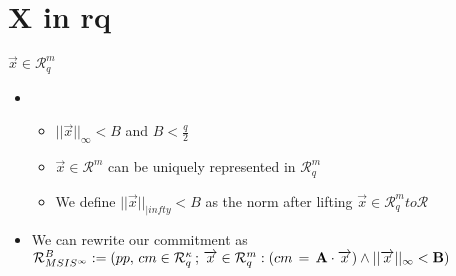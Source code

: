 \section{X in rq}
\begin{frame}{$\overrightarrow{x} \in \mathcal{R}^\mathit{m}_\mathit{q}$}
    \begin{itemize}
        \item  \begin{itemize}
                  \item $||\overrightarrow{x}||_{\infty} < B$ and $B < \frac{q}{2}$
                  \item $\overrightarrow{x} \in \mathcal{R}^m$ can be uniquely represented in $\mathcal{R}^m_q$
                  \item We define $||\overrightarrow{x}||_{|infty} < B$ as the norm after lifting $\overrightarrow{x} \in \mathcal{R}^m_q to \mathcal{R}$
              \end{itemize}
        \item We can rewrite our commitment as $\mathcal{R}^B_{MSIS^{\infty}} := {(pp, \, cm \in \mathcal{R}^{\kappa}_q\, ;\, \overrightarrow{x} \in \mathcal{R}^m_q : (cm\, =\, \bf{A}\cdot \overrightarrow{x} ) \land ||\overrightarrow{x}||_{\infty} < B  )}$
    \end{itemize}


\end{frame}